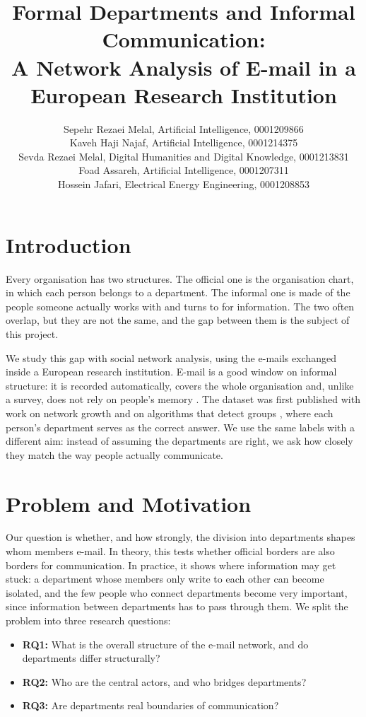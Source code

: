\documentclass[12pt, a4paper]{article}
\author{\normalsize Sepehr Rezaei Melal, Artificial Intelligence, 0001209866
\\\normalsize Kaveh Haji Najaf, Artificial Intelligence, 0001214375
\\\normalsize Sevda Rezaei Melal, Digital Humanities and Digital Knowledge, 0001213831
\\\normalsize Foad Assareh, Artificial Intelligence, 0001207311
\\\normalsize Hossein Jafari, Electrical Energy Engineering, 0001208853}
\date{}
\title{Formal Departments and Informal Communication:\\
A Network Analysis of E-mail in a European Research Institution}
\begin{document}
\maketitle

\section{Introduction}
\label{introduction}

Every organisation has two structures. The official one is the organisation
chart, in which each person belongs to a department. The informal one is made of
the people someone actually works with and turns to for information. The two
often overlap, but they are not the same, and the gap between them is the
subject of this project.

We study this gap with social network analysis, using the e-mails exchanged
inside a European research institution. E-mail is a good window on informal
structure: it is recorded automatically, covers the whole organisation and,
unlike a survey, does not rely on people's memory \cite{borgatti2018}. The
dataset was first published with work on network growth \cite{leskovec2007} and
on algorithms that detect groups \cite{yin2017}, where each person's department
serves as the correct answer. We use the same labels with a different aim:
instead of assuming the departments are right, we ask how closely they match
the way people actually communicate.

\section{Problem and Motivation}
\label{problem-and-motivation}

Our question is whether, and how strongly, the division into departments shapes
whom members e-mail. In theory, this tests whether official borders are also
borders for communication. In practice, it shows where information may get
stuck: a department whose members only write to each other can become isolated,
and the few people who connect departments become very important, since
information between departments has to pass through them. We split the problem
into three research questions:
\begin{itemize}
  \item \textbf{RQ1:} What is the overall structure of the e-mail network, and
        do departments differ structurally?
  \item \textbf{RQ2:} Who are the central actors, and who bridges departments?
  \item \textbf{RQ3:} Are departments real boundaries of communication?
\end{itemize}
\end{document}
